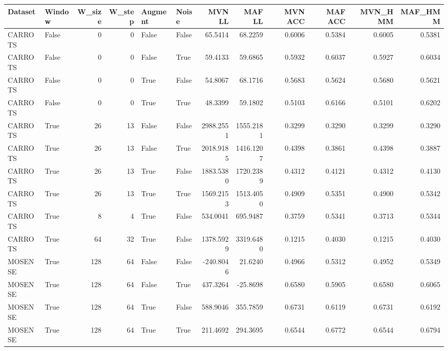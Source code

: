 \documentclass{article}
\begin{document}
\begin{tabular}{llrrllrrrrrr}
	\toprule
	Dataset &  Window &  W\_size &  W\_step &  Augment &  Noise &    MVN LL &    MAF LL &  MVN ACC &  MAF ACC &  MVN\_HMM &  MAF\_HMM \\
	\midrule
	CARROTS &   False &       0 &       0 &    False &  False &   65.5414 &   68.2259 &   0.6006 &   0.5384 &   0.6005 &   0.5381 \\
	CARROTS &   False &       0 &       0 &    False &   True &   59.4133 &   59.6865 &   0.5932 &   0.6037 &   0.5927 &   0.6034 \\
	CARROTS &   False &       0 &       0 &     True &  False &   54.8067 &   68.1716 &   0.5683 &   0.5624 &   0.5680 &   0.5621 \\
	CARROTS &   False &       0 &       0 &     True &   True &   48.3399 &   59.1802 &   0.5103 &   0.6166 &   0.5101 &   0.6202 \\
	CARROTS &    True &      26 &      13 &    False &  False & 2988.2551 & 1555.2181 &   0.3299 &   0.3290 &   0.3299 &   0.3290 \\
	CARROTS &    True &      26 &      13 &    False &   True & 2018.9185 & 1416.1207 &   0.4398 &   0.3861 &   0.4398 &   0.3887 \\
	CARROTS &    True &      26 &      13 &     True &  False & 1883.5380 & 1720.2389 &   0.4312 &   0.4121 &   0.4312 &   0.4130 \\
	CARROTS &    True &      26 &      13 &     True &   True & 1569.2153 & 1513.4050 &   0.4909 &   0.5351 &   0.4900 &   0.5342 \\
	CARROTS &    True &       8 &       4 &     True &  False &  534.0041 &  695.9487 &   0.3759 &   0.5341 &   0.3713 &   0.5344 \\
	CARROTS &    True &      64 &      32 &     True &  False & 1378.5929 & 3319.6480 &   0.1215 &   0.4030 &   0.1215 &   0.4030 \\
	MOSENSE &    True &     128 &      64 &    False &  False & -240.8046 &   21.6240 &   0.4966 &   0.5312 &   0.4952 &   0.5349 \\
	MOSENSE &    True &     128 &      64 &    False &   True &  437.3264 &  -25.8698 &   0.6580 &   0.5905 &   0.6580 &   0.6065 \\
	MOSENSE &    True &     128 &      64 &     True &  False &  588.9046 &  355.7859 &   0.6731 &   0.6119 &   0.6731 &   0.6192 \\
	MOSENSE &    True &     128 &      64 &     True &   True &  211.4692 &  294.3695 &   0.6544 &   0.6772 &   0.6544 &   0.6794 \\

\end{tabular}
\end{document}
